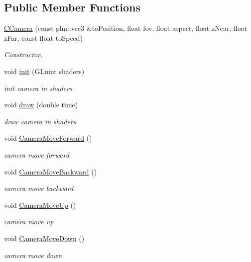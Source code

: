\subsection*{Public Member Functions}
\begin{DoxyCompactItemize}
\item 
\mbox{\hyperlink{class_c_camera_a1bb48d7dc7a9db872ed7d0150d2849b6}{C\+Camera}} (const glm\+::vec3 \&to\+Position, float fov, float aspect, float z\+Near, float z\+Far, const float to\+Speed)
\begin{DoxyCompactList}\small\item\em Constructor. \end{DoxyCompactList}\item 
void \mbox{\hyperlink{class_c_camera_a6e9888c96a4bf36281ca773bd0d6c6f3}{init}} (G\+Luint shaders)
\begin{DoxyCompactList}\small\item\em init camera in shaders \end{DoxyCompactList}\item 
void \mbox{\hyperlink{class_c_camera_aaeaa97e8cd4d4a78020a8e403965f818}{draw}} (double time)
\begin{DoxyCompactList}\small\item\em draw camera in shaders \end{DoxyCompactList}\item 
void \mbox{\hyperlink{class_c_camera_a9446bfa84185f4924bc0e518dd3dd766}{Camera\+Move\+Forward}} ()
\begin{DoxyCompactList}\small\item\em camera move forward \end{DoxyCompactList}\item 
void \mbox{\hyperlink{class_c_camera_a9d498be899e2eee1479dfef542a63a04}{Camera\+Move\+Backward}} ()
\begin{DoxyCompactList}\small\item\em camera move backward \end{DoxyCompactList}\item 
void \mbox{\hyperlink{class_c_camera_aaaaf41a9e27b36f79174113636c39e51}{Camera\+Move\+Up}} ()
\begin{DoxyCompactList}\small\item\em camera move up \end{DoxyCompactList}\item 
void \mbox{\hyperlink{class_c_camera_aa89809272db834f406ce4453b4399eef}{Camera\+Move\+Down}} ()
\begin{DoxyCompactList}\small\item\em camera move down \end{DoxyCompactList}\item 

\end{DoxyCompactItemize}

